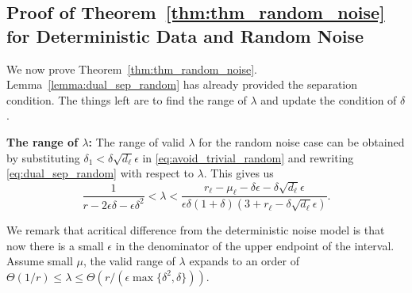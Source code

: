 \documentclass[twoside,11pt]{article}
\numberwithin{equation}{section}
\begin{document}
\subsection{Proof of Theorem~\ref{thm:thm_random_noise} for Deterministic Data and Random Noise}
We now prove Theorem~\ref{thm:thm_random_noise}. Lemma~\ref{lemma:dual_sep_random} has already provided the separation condition. The things left are to find the range of $\lambda$ and update the condition of $\delta$.

\noindent\textbf{The range of $\lambda$:}
The range of valid $\lambda$ for the random noise case can be obtained by substituting $\delta_1<\delta\sqrt{d_{\ell}}\epsilon$ in \eqref{eq:avoid_trivial_random} and rewriting \eqref{eq:dual_sep_random} with respect to $\lambda$. This gives us
\begin{equation}\label{eq:lambda_range_rand}
\frac{1}{r- 2\epsilon \delta-\epsilon\delta^2}<
        \lambda<\frac{r_{\ell}-\mu_{\ell}-\delta\epsilon - \delta \sqrt{d_{\ell}} \epsilon}{\epsilon\delta(1+\delta)(3+r_{\ell}-\delta\sqrt{d_{\ell}}\epsilon)}.
\end{equation}

  We remark that acritical difference from the deterministic noise model is that now there is a small $\epsilon$ in the denominator of the upper endpoint of the interval. Assume small $\mu$, the valid range of $\lambda$ expands to an order of $\Theta(1/r)\leq\lambda\leq \Theta(r/(\epsilon\max\{\delta^2,\delta\}))$.

\end{document}
